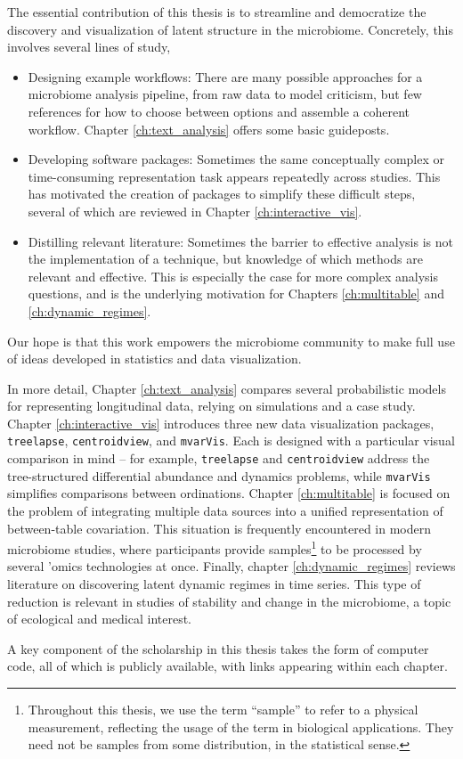 The essential contribution of this thesis is to streamline and democratize the
discovery and visualization of latent structure in the microbiome. Concretely,
this involves several lines of study,
\begin{itemize}
  \item Designing example workflows: There are many possible approaches for a
    microbiome analysis pipeline, from raw data to model criticism, but few
    references for how to choose between options and assemble a coherent
    workflow. Chapter \ref{ch:text_analysis} offers some basic guideposts.
  \item Developing software packages: Sometimes the same conceptually complex or
    time-consuming representation task appears repeatedly across studies. This
    has motivated the creation of packages to simplify these difficult steps,
    several of which are reviewed in Chapter \ref{ch:interactive_vis}.
  \item Distilling relevant literature: Sometimes the barrier to effective
    analysis is not the implementation of a technique, but knowledge of which
    methods are relevant and effective. This is especially the case for more
    complex analysis questions, and is the underlying motivation for
    Chapters \ref{ch:multitable} and \ref{ch:dynamic_regimes}.
\end{itemize}
Our hope is that this work empowers the microbiome community to make full use of
ideas developed in statistics and data visualization.

In more detail, Chapter \ref{ch:text_analysis} compares several probabilistic
models for representing longitudinal data, relying on simulations and a case
study. Chapter \ref{ch:interactive_vis} introduces three new data visualization
packages, \texttt{treelapse}, \texttt{centroidview}, and \texttt{mvarVis}. Each
is designed with a particular visual comparison in mind -- for example,
\texttt{treelapse} and \texttt{centroidview} address the tree-structured
differential abundance and dynamics problems, while \texttt{mvarVis} simplifies
comparisons between ordinations. Chapter \ref{ch:multitable} is focused on the
problem of integrating multiple data sources into a unified representation of
between-table covariation. This situation is frequently encountered in modern
microbiome studies, where participants provide samples\footnote{Throughout this
  thesis, we use the term ``sample'' to refer to a physical measurement,
  reflecting the usage of the term in biological applications. They need not be
  samples from some distribution, in the statistical sense.} to be processed by
several 'omics technologies at once. Finally, chapter \ref{ch:dynamic_regimes}
reviews literature on discovering latent dynamic regimes in time series. This
type of reduction is relevant in studies of stability and change in the
microbiome, a topic of ecological and medical interest.

A key component of the scholarship in this thesis takes the form of computer
code, all of which is publicly available, with links appearing within each
chapter.
